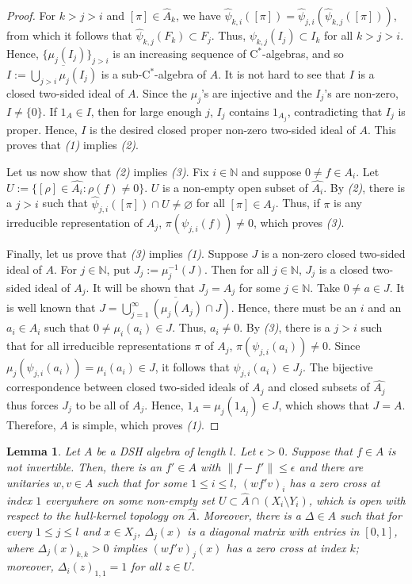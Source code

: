 \documentclass[12pt]{amsart}
\numberwithin{equation}{section}
\newtheorem{lemma}[theorem]{Lemma}
\theoremstyle{definition}
\theoremstyle{remark}
\newcommand{\NN}{\mathbb{N}}
\begin{document}
\begin{proof}
	For $k>j>i$ and $[\pi]\in \hat{A}_{k}$, we have $\hat{\psi}_{k,i}([\pi])=\hat{\psi}_{j,i}(\hat{\psi}_{k,j}([\pi]))$, from which it follows that $\hat{\psi}_{k,j}(F_{k})\subset F_{j}$. Thus, $\psi_{k,j}(I_{j})\subset I_{k}$ for all $k>j>i$. Hence, $\{\mu_{j}(I_{j})\}_{j>i}$ is an increasing sequence of $\mathrm{C}^*$-algebras, and so $I:=\overline{\bigcup_{j>i}\mu_{j}(I_{j})}$ is a sub-$\mathrm{C}^*$-algebra of $A$. It is not hard to see that $I$ is a closed two-sided ideal of $A$. Since the $\mu_{j}$'s are injective and the $I_{j}$'s are non-zero, $I\not=\{0\}$. If $1_{A}\in I$, then for large enough $j$, $I_{j}$ contains $1_{A_{j}}$, contradicting that $I_{j}$ is proper. Hence, $I$ is the desired closed proper non-zero two-sided ideal of $A$. This proves that \textit{(1)} implies \textit{(2)}.
	
	Let us now show that \textit{(2)} implies \textit{(3)}. Fix $i\in\NN$ and suppose $0\not=f\in A_{i}$. Let $U:=\{[\rho]\in\hat{A_{i}}:\rho(f)\not=0\}$. $U$ is a non-empty open subset of $\hat{A_{i}}$. By \textit{(2)}, there is a $j>i$ such that $\hat{\psi}_{j,i}([\pi])\cap U\not=\varnothing$ for all $[\pi]\in \hat{A_{j}}$. Thus, if $\pi$ is any irreducible representation of $A_{j}$, $\pi(\psi_{j,i}(f))\not=0$, which proves \textit{(3)}.
	
	Finally, let us prove that \textit{(3)} implies \textit{(1)}. Suppose $J$ is a non-zero closed two-sided ideal of $A$. For $j\in\NN$, put $J_{j}:=\mu_{j}^{-1}(J)$. Then for all $j\in\NN$, $J_{j}$ is a closed two-sided ideal of $A_{j}$. It will be shown that $J_{j}=A_{j}$ for some $j\in\NN$.	Take $0\not=a\in J$. It is well known that $J=\overline{\bigcup_{j=1}^{\infty}(\mu_{j}(A_{j})\cap J)}$. Hence, there must be an $i$ and an $a_{i}\in A_{i}$ such that $0\not=\mu_{i}(a_{i})\in J$. Thus, $a_{i}\not=0$. By \textit{(3)}, there is a $j>i$ such that for all irreducible representations $\pi$ of $A_{j}$, $\pi(\psi_{j,i}(a_{i}))\not=0$. Since $\mu_{j}(\psi_{j,i}(a_{i}))=\mu_{i}(a_{i})\in J$, it follows that $\psi_{j,i}(a_{i})\in J_{j}$. The bijective correspondence between closed two-sided ideals of $A_{j}$ and closed subsets of $\hat{A_{j}}$ thus forces $J_{j}$ to be all of $A_{j}$. Hence, $1_{A}=\mu_{j}(1_{A_{j}})\in J$, which shows that $J=A$. Therefore, $A$ is simple, which proves \textit{(1)}.
\end{proof}	


\begin{lemma}
	\label{perturb}
	Let $A$ be a DSH algebra of length $ l $. Let $\epsilon >0$. Suppose that $f\in A$ is not invertible. Then, there is an $f'\in A$ with $\|f-f'\|\leq\epsilon$ and there are unitaries $w,v\in A$ such that for some $1\leq i\leq  l $, $(wf'v)_{i}$ has a zero cross at index $1$ everywhere on some non-empty set $U\subset \hat{A}\cap (X_{i}\setminus Y_{i})$, which is open with respect to the hull-kernel topology on $\hat{A}$. Moreover, there is a $\Delta\in A$ such that for every $1\leq j\leq l $ and $x\in X_{j}$, $\Delta_{j}(x)$ is a diagonal matrix with entries in $[0,1]$, where $\Delta_{j}(x)_{k,k}>0$ implies $(wf'v)_{j}(x)$ has a zero cross at index $k$; moreover, $\Delta_{i}(z)_{1,1}=1$ for all $z\in U$. 
\end{lemma}
\end{document}
